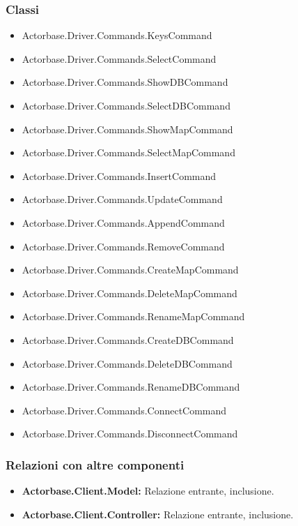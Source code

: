 \documentclass[a4paper]{article}
\begin{document}
		\subsubsection{Classi}
			\begin{itemize}
				\item Actorbase.Driver.Commands.KeysCommand
				\item Actorbase.Driver.Commands.SelectCommand
				\item Actorbase.Driver.Commands.ShowDBCommand
				\item Actorbase.Driver.Commands.SelectDBCommand
				\item Actorbase.Driver.Commands.ShowMapCommand
				\item Actorbase.Driver.Commands.SelectMapCommand
				\item Actorbase.Driver.Commands.InsertCommand
				\item Actorbase.Driver.Commands.UpdateCommand
				\item Actorbase.Driver.Commands.AppendCommand
				\item Actorbase.Driver.Commands.RemoveCommand
				\item Actorbase.Driver.Commands.CreateMapCommand
				\item Actorbase.Driver.Commands.DeleteMapCommand
				\item Actorbase.Driver.Commands.RenameMapCommand
				\item Actorbase.Driver.Commands.CreateDBCommand
				\item Actorbase.Driver.Commands.DeleteDBCommand
				\item Actorbase.Driver.Commands.RenameDBCommand
				\item Actorbase.Driver.Commands.ConnectCommand
				\item Actorbase.Driver.Commands.DisconnectCommand
			\end{itemize}
		
		\subsubsection{Relazioni con altre componenti}
			\begin{itemize}
				\item \textbf{Actorbase.Client.Model:} Relazione entrante, inclusione.
				\item \textbf{Actorbase.Client.Controller:}	Relazione entrante, inclusione.
			\end{itemize}

		
\end{document}
